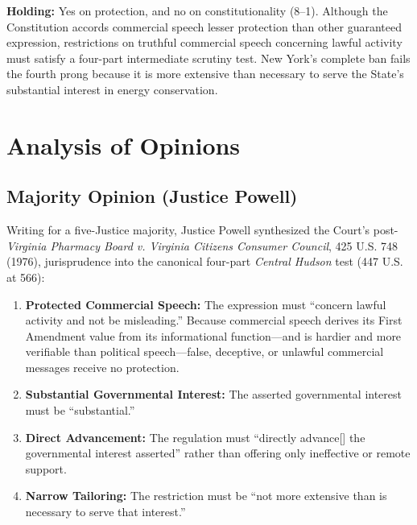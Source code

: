 \documentclass[12pt]{article}
\begin{document}
\textbf{Holding:} Yes on protection, and no on constitutionality (8--1). Although the Constitution accords commercial speech lesser protection than other guaranteed expression, restrictions on truthful commercial speech concerning lawful activity must satisfy a four-part intermediate scrutiny test. New York's complete ban fails the fourth prong because it is more extensive than necessary to serve the State's substantial interest in energy conservation.

\section{Analysis of Opinions}
\subsection{Majority Opinion (Justice Powell)}

Writing for a five-Justice majority, Justice Powell synthesized the Court's post-\textit{Virginia Pharmacy Board v. Virginia Citizens Consumer Council}, 425 U.S. 748 (1976), jurisprudence into the canonical four-part \textit{Central Hudson} test (447 U.S. at 566):
\begin{enumerate}
  \item \textbf{Protected Commercial Speech:} The expression must ``concern lawful activity and not be misleading.'' Because commercial speech derives its First Amendment value from its informational function---and is hardier and more verifiable than political speech---false, deceptive, or unlawful commercial messages receive no protection.
  \item \textbf{Substantial Governmental Interest:} The asserted governmental interest must be ``substantial.''
  \item \textbf{Direct Advancement:} The regulation must ``directly advance[] the governmental interest asserted'' rather than offering only ineffective or remote support.
  \item \textbf{Narrow Tailoring:} The restriction must be ``not more extensive than is necessary to serve that interest.''
\end{enumerate}
\end{document}
